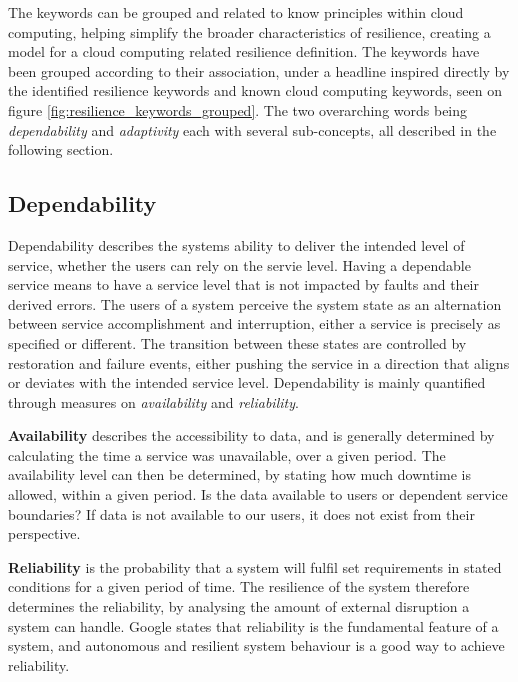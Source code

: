 The keywords can be grouped and related to know principles within cloud computing, helping simplify the broader characteristics of resilience, creating a model for a cloud computing related resilience definition. The keywords have been grouped according to their association, under a headline inspired directly by the identified resilience keywords and known cloud computing keywords, seen on figure \ref{fig:resilience_keywords_grouped}. The two overarching words being \textit{dependability} and \textit{adaptivity} each with several sub-concepts, all described in the following section.

\subsection{Dependability}
Dependability describes the systems ability to deliver the intended level of service, whether the users can rely on the servie level. Having a dependable service means to have a service level that is not impacted by faults and their derived errors. The users of a system perceive the system state as an alternation between service accomplishment and interruption, either a service is precisely as specified or different. The transition between these states are controlled by restoration and failure events, either pushing the service in a direction that aligns or deviates with the intended service level. Dependability is mainly quantified through measures on \textit{availability} and \textit{reliability}\cite{laprie1985dependable}.


\textbf{Availability} describes the accessibility to data, and is generally determined by calculating the time a service was unavailable, over a given period. The availability level can then be determined, by stating how much downtime is allowed, within a given period\cite[p. 477]{beyer2016siteReliabilityEngineering}. Is the data available to users or dependent service boundaries? If data is not available to our users, it does not exist from their perspective\cite[p. 345]{beyer2016siteReliabilityEngineering}.


\textbf{Reliability} is the probability that a system will fulfil set requirements in stated conditions for a given period of time\cite{o2012practical}. The resilience of the system therefore determines the reliability, by analysing the amount of external disruption a system can handle. Google states that reliability is the fundamental feature of a system, and autonomous and resilient system behaviour is a good way to achieve reliability\cite[p. 84]{beyer2016siteReliabilityEngineering}.


